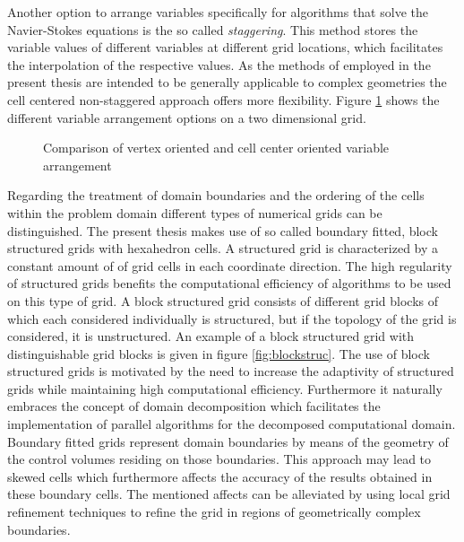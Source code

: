 Another option to arrange variables specifically for algorithms that solve the Navier-Stokes equations is the so called \emph{staggering}. This method stores the variable values of different variables at different grid locations, which facilitates the interpolation of the respective values. As the methods of employed in the present thesis are intended to be generally applicable to complex geometries the cell centered non-staggered approach offers more flexibility.  Figure \ref{fig:cellvertex} shows the different variable arrangement options on a two dimensional grid.

\begin{figure}
   \label{fig:cellvertex}
    \qquad
    \caption{Comparison of vertex oriented and cell center oriented variable arrangement}
\end{figure}

Regarding the treatment of domain boundaries and the ordering of the cells within the problem domain different types of numerical grids can be distinguished. The present thesis makes use of so called boundary fitted, block structured grids with hexahedron cells. A structured grid is characterized by a constant amount of of grid cells in each coordinate direction. The high regularity of structured grids benefits the computational efficiency of algorithms to be used on this type of grid. A block structured grid consists of different grid blocks of which each considered individually is structured, but if the topology of the grid is considered, it is unstructured. An example of a block structured grid with distinguishable grid blocks is given in figure \ref{fig:blockstruc}. The use of block structured grids is motivated by the need to increase the adaptivity of structured grids while maintaining high computational efficiency. Furthermore it naturally embraces the concept of domain decomposition which facilitates the implementation of parallel algorithms for the decomposed computational domain. Boundary fitted grids represent domain boundaries by means of the geometry of the control volumes residing on those boundaries. This approach may lead to skewed cells which furthermore affects the accuracy of the results obtained in these boundary cells. The mentioned affects can be alleviated by using local grid refinement techniques to refine the grid in regions of geometrically complex boundaries.

